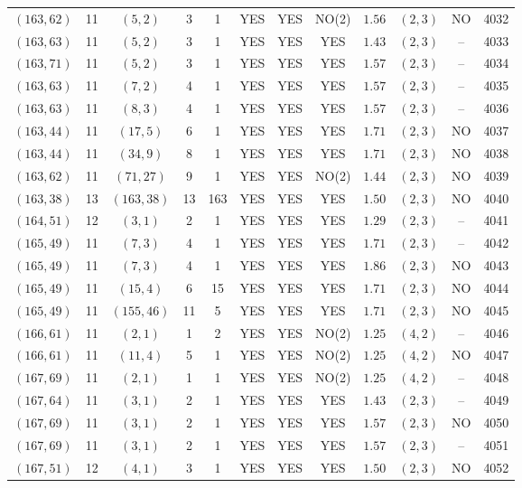 \begin{longtable}{|c|c|c|c|c|c|c|c|c|c|c|c|}
$(163,62)$ & 11 & $(5,2)$ & 3 & 1 & YES & YES & NO(2) & $1.56$ & $(2,3)$ & NO & 4032\\
$(163,63)$ & 11 & $(5,2)$ & 3 & 1 & YES & YES & YES & $1.43$ & $(2,3)$ & -- & 4033\\
$(163,71)$ & 11 & $(5,2)$ & 3 & 1 & YES & YES & YES & $1.57$ & $(2,3)$ & -- & 4034\\
$(163,63)$ & 11 & $(7,2)$ & 4 & 1 & YES & YES & YES & $1.57$ & $(2,3)$ & -- & 4035\\
$(163,63)$ & 11 & $(8,3)$ & 4 & 1 & YES & YES & YES & $1.57$ & $(2,3)$ & -- & 4036\\
$(163,44)$ & 11 & $(17,5)$ & 6 & 1 & YES & YES & YES & $1.71$ & $(2,3)$ & NO & 4037\\
$(163,44)$ & 11 & $(34,9)$ & 8 & 1 & YES & YES & YES & $1.71$ & $(2,3)$ & NO & 4038\\
$(163,62)$ & 11 & $(71,27)$ & 9 & 1 & YES & YES & NO(2) & $1.44$ & $(2,3)$ & NO & 4039\\
$(163,38)$ & 13 & $(163,38)$ & 13 & 163 & YES & YES & YES & $1.50$ & $(2,3)$ & NO & 4040\\
$(164,51)$ & 12 & $(3,1)$ & 2 & 1 & YES & YES & YES & $1.29$ & $(2,3)$ & -- & 4041\\
$(165,49)$ & 11 & $(7,3)$ & 4 & 1 & YES & YES & YES & $1.71$ & $(2,3)$ & -- & 4042\\
$(165,49)$ & 11 & $(7,3)$ & 4 & 1 & YES & YES & YES & $1.86$ & $(2,3)$ & NO & 4043\\
$(165,49)$ & 11 & $(15,4)$ & 6 & 15 & YES & YES & YES & $1.71$ & $(2,3)$ & NO & 4044\\
$(165,49)$ & 11 & $(155,46)$ & 11 & 5 & YES & YES & YES & $1.71$ & $(2,3)$ & NO & 4045\\
$(166,61)$ & 11 & $(2,1)$ & 1 & 2 & YES & YES & NO(2) & $1.25$ & $(4,2)$ & -- & 4046\\
$(166,61)$ & 11 & $(11,4)$ & 5 & 1 & YES & YES & NO(2) & $1.25$ & $(4,2)$ & NO & 4047\\
$(167,69)$ & 11 & $(2,1)$ & 1 & 1 & YES & YES & NO(2) & $1.25$ & $(4,2)$ & -- & 4048\\
$(167,64)$ & 11 & $(3,1)$ & 2 & 1 & YES & YES & YES & $1.43$ & $(2,3)$ & -- & 4049\\
$(167,69)$ & 11 & $(3,1)$ & 2 & 1 & YES & YES & YES & $1.57$ & $(2,3)$ & NO & 4050\\
$(167,69)$ & 11 & $(3,1)$ & 2 & 1 & YES & YES & YES & $1.57$ & $(2,3)$ & -- & 4051\\
$(167,51)$ & 12 & $(4,1)$ & 3 & 1 & YES & YES & YES & $1.50$ & $(2,3)$ & NO & 4052\\

\end{longtable}
